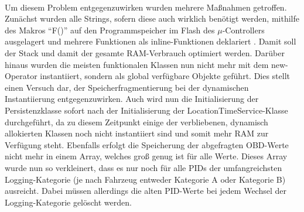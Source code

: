 \paragraph{}
Um diesem Problem entgegenzuwirken wurden mehrere Maßnahmen getroffen. Zunächst wurden alle Strings, sofern diese auch wirklich benötigt werden, mithilfe des Makros \enquote{F()} auf den Programmspeicher im Flash des $\mu$-Controllers ausgelagert und mehrere Funktionen als inline-Funktionen deklariert \cite{ardRAMopt}. Damit soll der Stack und damit der gesamte RAM-Verbrauch optimiert werden. Darüber hinaus wurden die meisten funktionalen Klassen nun nicht mehr mit dem new-Operator instantiiert, sondern als global verfügbare Objekte geführt. Dies stellt einen Versuch dar, der Speicherfragmentierung bei der dynamischen Instantiierung entgegenzuwirken. Auch wird nun die Initialisierung der Persistenzklasse sofort nach der Initialisierung der LocationTimeService-Klasse durchgeführt, da zu diesem Zeitpunkt einige der verbliebenen, dynamisch allokierten Klassen noch nicht instantiiert sind und somit mehr RAM zur Verfügung steht.
Ebenfalls erfolgt die Speicherung der abgefragten OBD-Werte nicht mehr in einem Array, welches groß genug ist für alle Werte. Dieses Array wurde nun so verkleinert, dass es nur noch für alle PIDs der umfangreichsten Logging-Kategorie (je nach Fahrzeug entweder Kategorie A oder Kategorie B) ausreicht. Dabei müssen allerdings die alten PID-Werte bei jedem Wechsel der Logging-Kategorie gelöscht werden.
\pagebreak
